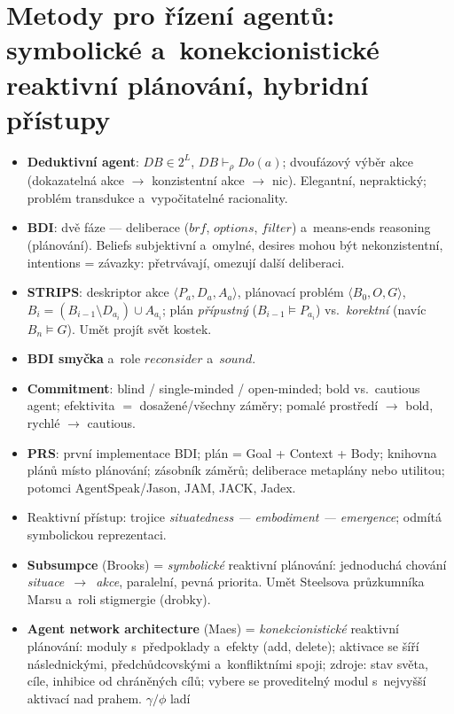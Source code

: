 \documentclass[11pt,a4paper]{article}
\theoremstyle{definition}
\begin{document}
\section{Metody pro řízení agentů: symbolické a~konekcionistické reaktivní plánování, hybridní přístupy}
\begin{itemize}
\item \textbf{Deduktivní agent}: $\mathit{DB} \in 2^L$, $\mathit{DB} \vdash_\rho \mathit{Do}(a)$;
 dvoufázový výběr akce (dokazatelná akce $\to$ konzistentní akce $\to$ nic).
 Elegantní, nepraktický; problém transdukce a~vypočitatelné racionality.
\item \textbf{BDI}: dvě fáze --- deliberace ($\mathit{brf}$, $\mathit{options}$, $\mathit{filter}$)
 a~means-ends reasoning (plánování). Beliefs subjektivní a~omylné, desires mohou být
 nekonzistentní, intentions = závazky: přetrvávají, omezují další deliberaci.
\item \textbf{STRIPS}: deskriptor akce $\langle P_a,D_a,A_a\rangle$, plánovací problém
 $\langle B_0,O,G\rangle$, $B_i = (B_{i-1}\setminus D_{a_i})\cup A_{a_i}$;
 plán \emph{přípustný} ($B_{i-1}\models P_{a_i}$) vs.\ \emph{korektní} (navíc $B_n \models G$).
 Umět projít svět kostek.
\item \textbf{BDI smyčka} a~role $\mathit{reconsider}$ a~$\mathit{sound}$.
\item \textbf{Commitment}: blind / single-minded / open-minded; bold vs.\ cautious agent;
 efektivita $=$ dosažené/všechny záměry; pomalé prostředí $\to$ bold, rychlé $\to$ cautious.
\item \textbf{PRS}: první implementace BDI; plán = Goal + Context + Body; knihovna plánů místo
 plánování; zásobník záměrů; deliberace metaplány nebo utilitou; potomci AgentSpeak/Jason,
 JAM, JACK, Jadex.
\item Reaktivní přístup: trojice \emph{situatedness --- embodiment --- emergence};
 odmítá symbolickou reprezentaci.
\item \textbf{Subsumpce} (Brooks) = \emph{symbolické} reaktivní plánování: jednoduchá chování
 \emph{situace~$\to$~akce}, paralelní, pevná priorita.
 Umět Steelsova průzkumníka Marsu a~roli stigmergie (drobky).
\item \textbf{Agent network architecture} (Maes) = \emph{konekcionistické} reaktivní
 plánování: moduly s~předpoklady a~efekty (add, delete); aktivace se šíří následnickými,
 předchůdcovskými a~konfliktními spoji; zdroje: stav světa, cíle, inhibice od chráněných
 cílů; vybere se proveditelný modul s~nejvyšší aktivací nad prahem. $\gamma/\phi$ ladí

\end{itemize}
\end{document}
